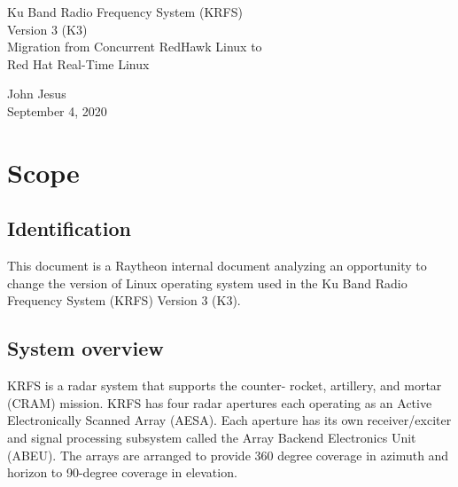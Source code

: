 \documentclass[12pt]{article}
\begin{document}
\thispagestyle{empty}
\begin{titlepage}
\begin{center}
        \vspace*{1cm}

        \LARGE{Ku Band Radio Frequency System (KRFS) \\
        Version 3 (K3) \\
        Migration from Concurrent RedHawk Linux to \\
        Red Hat Real-Time Linux}

        \vspace{0.5cm}
        \LARGE

        \vspace{1.5cm}

        \normalsize

        John Jesus \\
        September 4, 2020

        \vfill



        \vspace{0.8cm}




\end{center}
\end{titlepage}

\tableofcontents

%
\newpage
\section{Scope}
\subsection{Identification}
This document is a Raytheon internal document analyzing an opportunity to change
the version of Linux operating system used in the Ku Band Radio Frequency System
(KRFS) Version 3 (K3).

\subsection{System overview}
KRFS is a radar system that supports the counter- rocket, artillery, and mortar
(CRAM) mission.  KRFS has four radar apertures each operating as an Active
Electronically Scanned Array (AESA).  Each aperture has its own receiver/exciter
and signal processing subsystem called the Array Backend Electronics Unit
(ABEU).  The arrays are arranged to provide 360 degree coverage in azimuth and
horizon to 90-degree coverage in elevation.
\end{document}
